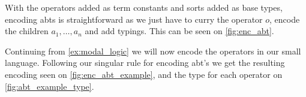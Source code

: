 \documentclass[sigplan,screen]{acmart}
\begin{document}
With the operators added as term constants and sorts added as base types, encoding abts is straightforward as we just have to curry the operator $o$, encode the children $a_1, \dots, a_n$ and add typings. This can be seen on \cref{fig:enc_abt}.


\begin{example}\label{ex:enc_abt_example}
    Continuing from \cref{ex:modal_logic} we will now encode the operators in our small language. Following our singular rule for encoding abt's we get the resulting encoding seen on \cref{fig:enc_abt_example}, and the type for each operator on \cref{fig:abt_example_type}.
    
    
    
\end{example}
\end{document}
